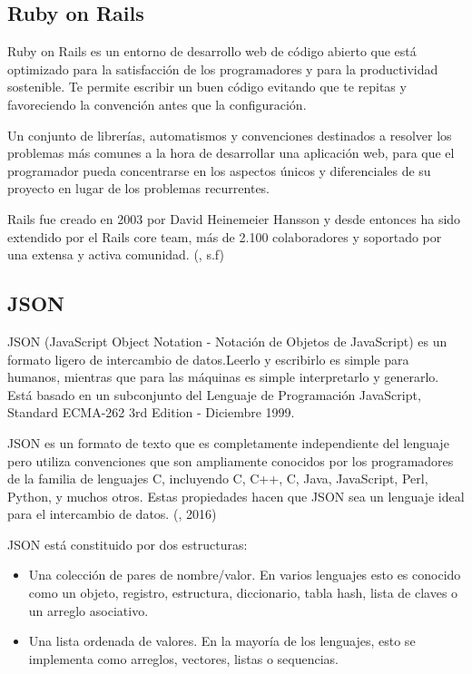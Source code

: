 
\subsection{Ruby on Rails}
\setlength{\parskip}{5mm}
Ruby on Rails es un entorno de desarrollo web de código abierto que está optimizado para la satisfacción de los programadores y para la productividad sostenible. Te permite escribir un buen código evitando que te repitas y favoreciendo la convención antes que la configuración.

Un conjunto de librerías, automatismos y convenciones destinados a resolver los problemas más comunes a la hora de desarrollar una aplicación web, para que el programador pueda concentrarse en los aspectos únicos y diferenciales de su proyecto en lugar de los problemas recurrentes.

Rails fue creado en 2003 por David Heinemeier Hansson y desde entonces ha sido extendido por el Rails core team, más de 2.100 colaboradores y soportado por una extensa y activa comunidad. (\citet{rubybib}, s.f)

\setlength{\parskip}{0mm}



\subsection{JSON}
\setlength{\parskip}{5mm}
JSON (JavaScript Object Notation - Notación de Objetos de JavaScript) es un formato ligero de intercambio de datos.Leerlo y escribirlo es simple para humanos, mientras que para las máquinas es simple interpretarlo y generarlo. Está basado en un subconjunto del Lenguaje de Programación JavaScript, Standard ECMA-262 3rd Edition - Diciembre 1999. 

JSON es un formato de texto que es completamente independiente del lenguaje pero utiliza convenciones que son ampliamente conocidos por los programadores de la familia de lenguajes C, incluyendo C, C++, C, Java, JavaScript, Perl, Python, y muchos otros. Estas propiedades hacen que JSON sea un lenguaje ideal para el intercambio de datos. (\citet{jsonbib}, 2016)

JSON está constituido por dos estructuras:
 \setlength{\parskip}{0mm}
\begin{itemize}

	\item Una colección de pares de nombre/valor. En varios lenguajes esto es conocido como un objeto, registro, estructura, diccionario, tabla hash, lista de claves o un arreglo asociativo.
	
	\item Una lista ordenada de valores. En la mayoría de los lenguajes, esto se implementa como arreglos, vectores, listas o sequencias.

	
\end{itemize}

